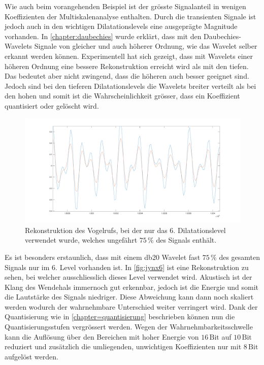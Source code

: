 \begin{refsection}
Wie auch beim vorangehenden Beispiel ist der grösste Signalanteil in wenigen Koeffizienten der Multiskalenanalyse enthalten.
Durch die transienten Signale ist jedoch auch in den wichtigen Dilatationslevels eine ausgeprägte Magnitude vorhanden.
In \autoref{chapter:daubechies} wurde erklärt, dass mit den Daubechies-Wavelets Signale von gleicher und auch höherer Ordnung, wie das Wavelet selber erkannt werden können. 
Experimentell hat sich gezeigt, dass mit Wavelets einer höheren Ordnung eine bessere Rekonstruktion erreicht wird als mit den tiefen.
Das bedeutet aber nicht zwingend, dass die höheren auch besser geeignet sind.
Jedoch sind bei den tieferen Dilatationslevels die Wavelets breiter verteilt als bei den hohen und somit ist die Wahrscheinlichkeit grösser, dass ein Koeffizient quantisiert oder gelöscht wird. 
\begin{figure}
	\centering
	\includegraphics[width=\linewidth]{papers/compress/Bilder/jynxNear.pdf}
	\caption{Rekonstruktion des Vogelrufs, bei der nur das 6. Dilatationslevel verwendet wurde, welches ungefährt $75\,\textbf{\%}$ des Signals enthält.}
	\label{fig:jynx6}
\end{figure}
Es ist besonders erstaunlich, dass mit einem db20 Wavelet fast $75\,\text{\%}$ des gesamten Signals nur im 6. Level vorhanden ist.
In \autoref{fig:jynx6} ist eine Rekonstruktion zu sehen, bei welcher ausschliesslich dieses Level verwendet wird.
Akustisch ist der Klang des Wendehals immernoch gut erkennbar, jedoch ist die Energie und somit die Lautstärke des Signals niedriger.
Diese Abweichung kann dann noch skaliert werden wodurch der wahrnehmbare Unterschied weiter verringert wird.
Dank der Quantisierung wie in \autoref{chapter=quantisierung} beschrieben können nun die Quantisierungsstufen vergrössert werden.
Wegen der Wahrnehmbarkeitsschwelle kann die Auflösung über den Bereichen mit hoher Energie von $16\,\text{Bit}$ auf $10\,\text{Bit}$ reduziert und zusätzlich die umliegenden, unwichtigen Koeffizienten nur mit $8\,\text{Bit}$ aufgelöst werden.


\end{refsection}
